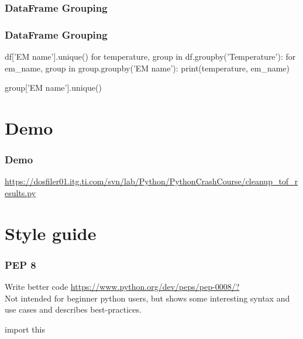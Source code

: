 \documentclass[12pt]{beamer}
\begin{document}
\subsubsection{DataFrame Grouping}
\begin{frame}[fragile]
\frametitle{DataFrame Grouping}
\begin{pyconsole}
df['EM name'].unique()
for temperature, group in df.groupby('Temperature'):
  for em_name, group in group.groupby('EM name'):
    print(temperature, em_name)

group['EM name'].unique()
\end{pyconsole}
\end{frame}

\section{Demo}
\begin{frame}[fragile]
\frametitle{Demo}
\url{https://dosfiler01.itg.ti.com/svn/lab/Python/PythonCrashCourse/cleanup_tof_results.py}
\end{frame}

\section{Style guide}
\begin{frame}[fragile]
\frametitle{PEP 8}
Write better code
\url{https://www.python.org/dev/peps/pep-0008/?}\\
Not intended for beginner python users, but shows some interesting syntax and use cases and
describes best-practices.

\end{frame}

\begin{frame}[fragile]
\begin{footnotesize}
\begin{pyconsole}
import this
\end{pyconsole}
\end{footnotesize}
\end{frame}
\end{document}
